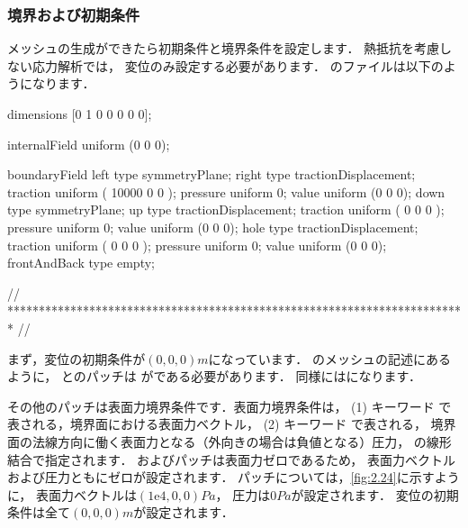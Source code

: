 \subsubsection{境界および初期条件}
\label{sssec:2.2.1.1}
メッシュの生成ができたら初期条件と境界条件を設定します．
熱抵抗を考慮しない応力解析では，
変位のみ設定する必要があります．
のファイルは以下のようになります．
\begin{OFverbatim}[file, linenum=17]
dimensions      [0 1 0 0 0 0 0];

internalField   uniform (0 0 0);

boundaryField
{
    left
    {
        type            symmetryPlane;
    }
    right
    {
        type            tractionDisplacement;
        traction        uniform ( 10000 0 0 );
        pressure        uniform 0;
        value           uniform (0 0 0);
    }
    down
    {
        type            symmetryPlane;
    }
    up
    {
        type            tractionDisplacement;
        traction        uniform ( 0 0 0 );
        pressure        uniform 0;
        value           uniform (0 0 0);
    }
    hole
    {
        type            tractionDisplacement;
        traction        uniform ( 0 0 0 );
        pressure        uniform 0;
        value           uniform (0 0 0);
    }
    frontAndBack
    {
        type            empty;
    }
}

// ************************************************************************* //
\end{OFverbatim}
まず，変位の初期条件が$(0, 0, 0)\unit{m}$になっています．
のメッシュの記述にあるように，
とのパッチは
がである必要があります．
同様にはになります．

その他のパッチは表面力境界条件です．表面力境界条件は，
(1) キーワード
%
%
で表される，境界面における表面力ベクトル，
(2) キーワード
%
%
で表される，
境界面の法線方向に働く表面力となる（外向きの場合は負値となる）圧力，
の線形結合で指定されます．
およびパッチは表面力ゼロであるため，
表面力ベクトルおよび圧力ともにゼロが設定されます．
パッチについては，\autoref{fig:2.24}に示すように，
表面力ベクトルは$(1\mathrm{e}4, 0, 0)\unit{Pa}$，
圧力は$0\unit{Pa}$が設定されます．
変位の初期条件は全て$(0, 0, 0)\unit{m}$が設定されます．

